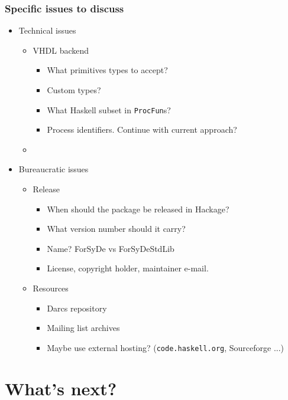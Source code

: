 \documentclass{beamer}
\begin{document}
\begin{frame}
  \frametitle{Specific issues to discuss}
 \begin{itemize}
 \item Technical issues
 \begin{itemize}
  \item VHDL backend
   \begin{itemize} 
    \item What primitives types to accept? 
    \item Custom types?
    \item What Haskell subset in \texttt{ProcFun}s?
   \item Process identifiers. Continue with current approach?
   \end{itemize} 
  \item 
 \end{itemize}
 \item Bureaucratic issues
 \begin{itemize}
  \item Release
  \begin{itemize}
    \item When should the package be released in Hackage?
    \item What version number should it carry?
    \item Name? ForSyDe vs ForSyDeStdLib
   \item License, copyright holder, maintainer e-mail.
  \end{itemize}
 \item Resources
  \begin{itemize}
  \item Darcs repository
  \item Mailing list archives
  \item Maybe use external hosting? 
    (\texttt{code.haskell.org}, Sourceforge ...)
  \end{itemize}
 \end{itemize}
 \end{itemize}
\end{frame}

\section{What's next?}
\end{document}
